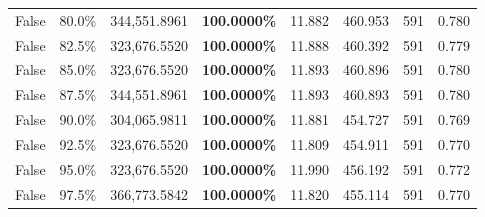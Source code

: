 \begin{table}[H]
\begin{tabular}{lllrllll}
\cline{1-8}
False & 80.0\% & 344,551.8961 & \bfseries \color{red} 100.0000\% & 11.882 & 460.953 & 591 & 0.780 \\
\cline{1-8}
False & 82.5\% & 323,676.5520 & \bfseries \color{red} 100.0000\% & 11.888 & 460.392 & 591 & 0.779 \\
\cline{1-8}
False & 85.0\% & 323,676.5520 & \bfseries \color{red} 100.0000\% & 11.893 & 460.896 & 591 & 0.780 \\
\cline{1-8}
False & 87.5\% & 344,551.8961 & \bfseries \color{red} 100.0000\% & 11.893 & 460.893 & 591 & 0.780 \\
\cline{1-8}
False & 90.0\% & 304,065.9811 & \bfseries \color{red} 100.0000\% & 11.881 & 454.727 & 591 & 0.769 \\
\cline{1-8}
False & 92.5\% & 323,676.5520 & \bfseries \color{red} 100.0000\% & 11.809 & 454.911 & 591 & 0.770 \\
\cline{1-8}
False & 95.0\% & 323,676.5520 & \bfseries \color{red} 100.0000\% & 11.990 & 456.192 & 591 & 0.772 \\
\cline{1-8}
False & 97.5\% & 366,773.5842 & \bfseries \color{red} 100.0000\% & 11.820 & 455.114 & 591 & 0.770 \\
\cline{1-8}
\bottomrule
\end{tabular}
\end{table}
